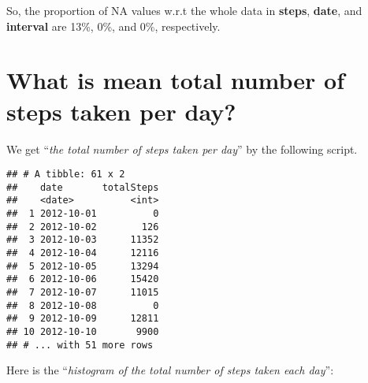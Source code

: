 \documentclass[]{article}
\newenvironment{Shaded}{\begin{snugshade}}{\end{snugshade}}
\newcommand{\KeywordTok}[1]{\textcolor[rgb]{0.13,0.29,0.53}{\textbf{#1}}}
\newcommand{\DataTypeTok}[1]{\textcolor[rgb]{0.13,0.29,0.53}{#1}}
\newcommand{\DecValTok}[1]{\textcolor[rgb]{0.00,0.00,0.81}{#1}}
\newcommand{\StringTok}[1]{\textcolor[rgb]{0.31,0.60,0.02}{#1}}
\newcommand{\OtherTok}[1]{\textcolor[rgb]{0.56,0.35,0.01}{#1}}
\newcommand{\OperatorTok}[1]{\textcolor[rgb]{0.81,0.36,0.00}{\textbf{#1}}}
\newcommand{\NormalTok}[1]{#1}
\begin{document}
So, the proportion of NA values w.r.t the whole data in \textbf{steps},
\textbf{date}, and \textbf{interval} are 13\%, 0\%, and 0\%,
respectively.

\section{What is mean total number of steps taken per
day?}\label{what-is-mean-total-number-of-steps-taken-per-day}

We get ``\emph{the total number of steps taken per day}'' by the
following script.

\begin{Shaded}
\end{Shaded}

\begin{verbatim}
## # A tibble: 61 x 2
##    date       totalSteps
##    <date>          <int>
##  1 2012-10-01          0
##  2 2012-10-02        126
##  3 2012-10-03      11352
##  4 2012-10-04      12116
##  5 2012-10-05      13294
##  6 2012-10-06      15420
##  7 2012-10-07      11015
##  8 2012-10-08          0
##  9 2012-10-09      12811
## 10 2012-10-10       9900
## # ... with 51 more rows
\end{verbatim}

Here is the ``\emph{histogram of the total number of steps taken each
day}'':

\begin{Shaded}
\end{Shaded}
\end{document}
